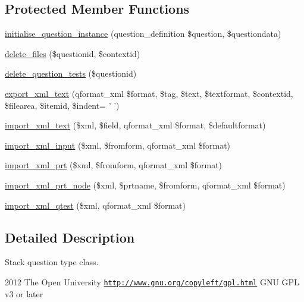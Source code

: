 \subsection*{Protected Member Functions}
\begin{DoxyCompactItemize}
\item 
\hyperlink{classqtype__stack_ab671a63ff15114501826a844ddd6eb21}{initialise\_\-question\_\-instance} (question\_\-definition \$question, \$questiondata)
\item 
\hyperlink{classqtype__stack_aab3047dc06ec4383ae570894cf1fe349}{delete\_\-files} (\$questionid, \$contextid)
\item 
\hyperlink{classqtype__stack_aa04a9197ef37eff57dca6ca2a04f5d83}{delete\_\-question\_\-tests} (\$questionid)
\item 
\hyperlink{classqtype__stack_a24ce86687f817bda0e265a8dd37889f0}{export\_\-xml\_\-text} (qformat\_\-xml \$format, \$tag, \$text, \$textformat, \$contextid, \$filearea, \$itemid, \$indent= ' ')
\item 
\hyperlink{classqtype__stack_a8b6857a53ed1326881b0d1366da083e5}{import\_\-xml\_\-text} (\$xml, \$field, qformat\_\-xml \$format, \$defaultformat)
\item 
\hyperlink{classqtype__stack_adb3dbc4c2122921992b19768cd0405c9}{import\_\-xml\_\-input} (\$xml, \$fromform, qformat\_\-xml \$format)
\item 
\hyperlink{classqtype__stack_a9de32a45ce824d8c0e4dffa056846876}{import\_\-xml\_\-prt} (\$xml, \$fromform, qformat\_\-xml \$format)
\item 
\hyperlink{classqtype__stack_a555399cd47d276ee107e157ae6db66b2}{import\_\-xml\_\-prt\_\-node} (\$xml, \$prtname, \$fromform, qformat\_\-xml \$format)
\item 
\hyperlink{classqtype__stack_a693b6fe2aad3cd3a2257e5ab3530972b}{import\_\-xml\_\-qtest} (\$xml, qformat\_\-xml \$format)
\end{DoxyCompactItemize}


\subsection{Detailed Description}
Stack question type class.

2012 The Open University  \href{http://www.gnu.org/copyleft/gpl.html}{\tt http://www.gnu.org/copyleft/gpl.html} GNU GPL v3 or later 

